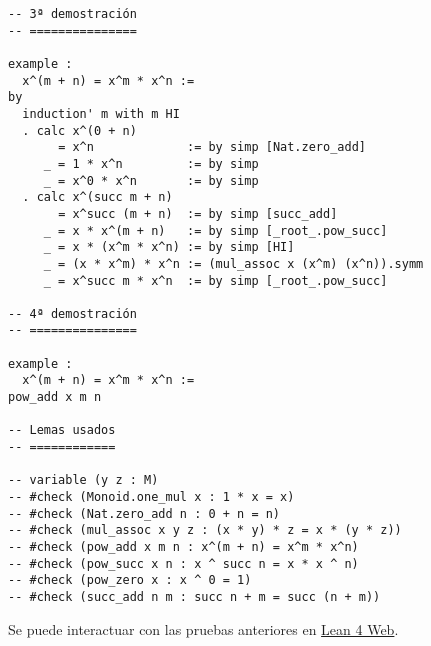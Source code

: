 \begin{verbatim}
-- 3ª demostración
-- ===============

example :
  x^(m + n) = x^m * x^n :=
by
  induction' m with m HI
  . calc x^(0 + n)
       = x^n             := by simp [Nat.zero_add]
     _ = 1 * x^n         := by simp
     _ = x^0 * x^n       := by simp
  . calc x^(succ m + n)
       = x^succ (m + n)  := by simp [succ_add]
     _ = x * x^(m + n)   := by simp [_root_.pow_succ]
     _ = x * (x^m * x^n) := by simp [HI]
     _ = (x * x^m) * x^n := (mul_assoc x (x^m) (x^n)).symm
     _ = x^succ m * x^n  := by simp [_root_.pow_succ]

-- 4ª demostración
-- ===============

example :
  x^(m + n) = x^m * x^n :=
pow_add x m n

-- Lemas usados
-- ============

-- variable (y z : M)
-- #check (Monoid.one_mul x : 1 * x = x)
-- #check (Nat.zero_add n : 0 + n = n)
-- #check (mul_assoc x y z : (x * y) * z = x * (y * z))
-- #check (pow_add x m n : x^(m + n) = x^m * x^n)
-- #check (pow_succ x n : x ^ succ n = x * x ^ n)
-- #check (pow_zero x : x ^ 0 = 1)
-- #check (succ_add n m : succ n + m = succ (n + m))
\end{verbatim}
Se puede interactuar con las pruebas anteriores en \href{https://lean.math.hhu.de/\#url=https://raw.githubusercontent.com/jaalonso/Calculemus2/main/src/Producto\_de\_potencias\_de\_la\_misma\_base\_en\_monoides.lean}{Lean 4 Web}.

